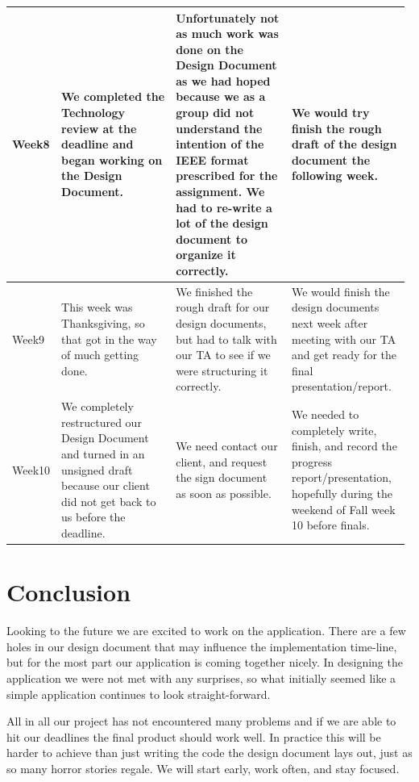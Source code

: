 \begin{longtable}{ | p{0.075\linewidth} | p{0.3\linewidth} | p{0.3\linewidth} | p{0.3\linewidth} |}
    Week8 &
  	We completed the Technology review at the deadline and began working on the Design Document. &
  	Unfortunately not as much work was done on the Design Document as we had hoped because we as a group did not understand the intention of the IEEE format prescribed for the assignment. We had to re-write a lot of the design document to organize it correctly. &
    We would try finish the rough draft of the design document the following week. \\ \hline
    Week9 &
  	This week was Thanksgiving, so that got in the way of much getting done. &
  	We finished the rough draft for our design documents, but had to talk with our TA to see if we were structuring it correctly.&
  	We would finish the design documents next week after meeting with our TA and get ready for the final presentation/report.  \\ \hline
    Week10 &
  	We completely restructured our Design Document and turned in an unsigned draft because our client did not get back to us before the deadline. &
  	We need contact our client, and request the sign document as soon as possible. &
   	We needed to completely write, finish, and record the progress report/presentation, hopefully during the weekend of Fall week 10 before finals. \\ \hline
\end{longtable}

\section{Conclusion}

Looking to the future we are excited to work on the application.
There are a few holes in our design document that may influence the implementation time-line, but for the most part our application is coming together nicely.
In designing the application we were not met with any surprises, so what initially seemed like a simple application continues to look straight-forward.

All in all our project has not encountered many problems and if we are able to hit our deadlines the final product should work well.
In practice this will be harder to achieve than just writing the code the design document lays out, just as so many horror stories regale.
We will start early, work often, and stay focused.

\printbibliography


